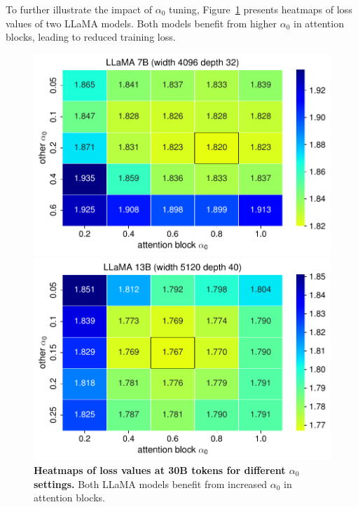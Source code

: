 To further illustrate the impact of $\alpha_0$ tuning, Figure~\ref{figure:heat} presents heatmaps of loss values of two LLaMA models. Both models benefit from higher $\alpha_0$ in attention blocks, leading to reduced training loss. 

\begin{figure}[h]
\centering
\begin{minipage}{0.49\textwidth}
\includegraphics[width=1.04\linewidth]{figures/llama7B_alpha.pdf}
\end{minipage}
\hfill
\begin{minipage}{0.49\textwidth}
\includegraphics[width=1.04\linewidth]{figures/llama13B_alpha.pdf}
\end{minipage}
\hfill
\caption{\textbf{Heatmaps of loss values at 30B tokens for different $\alpha_0$ settings.} Both LLaMA models benefit from increased $\alpha_0$ in attention blocks.} 
\label{figure:heat}
\end{figure}

